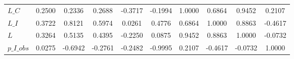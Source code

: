 \begin{center}
\begin{longtable}{lccccccccc}
$L\_C            $	 & 	            0.2500	 & 	            0.2336	 & 	            0.2688	 & 	           -0.3717	 & 	           -0.1994	 & 	            1.0000	 & 	            0.6864	 & 	            0.9452	 & 	            0.2107 \\ 
$L\_I            $	 & 	            0.3722	 & 	            0.8121	 & 	            0.5974	 & 	            0.0261	 & 	            0.4776	 & 	            0.6864	 & 	            1.0000	 & 	            0.8863	 & 	           -0.4617 \\ 
$L               $	 & 	            0.3264	 & 	            0.5135	 & 	            0.4395	 & 	           -0.2250	 & 	            0.0875	 & 	            0.9452	 & 	            0.8863	 & 	            1.0000	 & 	           -0.0732 \\ 
$p\_I\_obs       $	 & 	            0.0275	 & 	           -0.6942	 & 	           -0.2761	 & 	           -0.2482	 & 	           -0.9995	 & 	            0.2107	 & 	           -0.4617	 & 	           -0.0732	 & 	            1.0000 \\ 
\end{longtable}
 \end{center}
